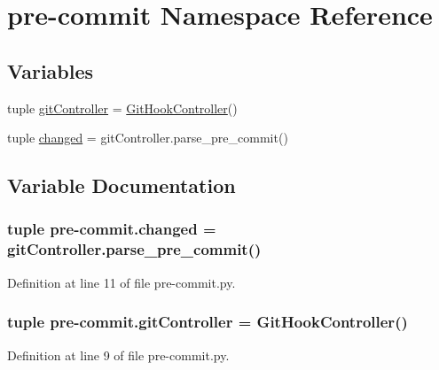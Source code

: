 \section{pre-\/commit Namespace Reference}
\label{namespacepre-commit}
\subsection*{Variables}
\begin{DoxyCompactItemize}
\item 
tuple \hyperlink{namespacepre-commit_a95f05a041aa51857ded4a498e766b83d}{git\-Controller} = \hyperlink{classgithookcontroller_1_1GitHookController}{Git\-Hook\-Controller}()
\item 
tuple \hyperlink{namespacepre-commit_a1c824fbe54d00a54423cb4955f97dcf5}{changed} = git\-Controller.\-parse\-\_\-pre\-\_\-commit()
\end{DoxyCompactItemize}


\subsection{Variable Documentation}
\subsubsection[{changed}]{\setlength{\rightskip}{0pt plus 5cm}tuple pre-\/commit.\-changed = git\-Controller.\-parse\-\_\-pre\-\_\-commit()}\label{namespacepre-commit_a1c824fbe54d00a54423cb4955f97dcf5}


Definition at line 11 of file pre-\/commit.\-py.

\subsubsection[{git\-Controller}]{\setlength{\rightskip}{0pt plus 5cm}tuple pre-\/commit.\-git\-Controller = {\bf Git\-Hook\-Controller}()}\label{namespacepre-commit_a95f05a041aa51857ded4a498e766b83d}


Definition at line 9 of file pre-\/commit.\-py.

